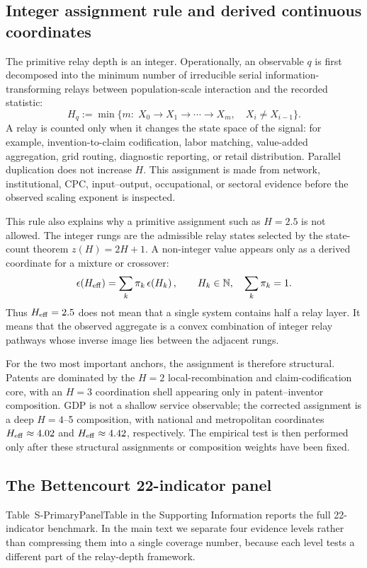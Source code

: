 \subsection{Integer assignment rule and derived continuous coordinates}
\label{subsec:integer_assignment_rule}

The primitive relay depth is an integer. Operationally, an observable \(q\)
is first decomposed into the minimum number of irreducible serial
information-transforming relays between population-scale interaction and the
recorded statistic:
\[
H_q := \min\{m:\; X_0\rightarrow X_1\rightarrow\cdots\rightarrow X_m,
\quad X_i\neq X_{i-1}\}.
\]
A relay is counted only when it changes the state space of the signal:
for example, invention-to-claim codification, labor matching, value-added
aggregation, grid routing, diagnostic reporting, or retail distribution.
Parallel duplication does not increase \(H\). This assignment is made from
network, institutional, CPC, input--output, occupational, or sectoral evidence
before the observed scaling exponent is inspected.

This rule also explains why a primitive assignment such as \(H=2.5\) is not
allowed. The integer rungs are the admissible relay states selected by the
state-count theorem \(z(H)=2H+1\). A non-integer value appears only as a
derived coordinate for a mixture or crossover:
\[
\epsilon\!\left(H_{\mathrm{eff}}\right)=\sum_k \pi_k\,\epsilon\!\left(H_k\right),
\qquad H_k\in\mathbb{N},\quad \sum_k\pi_k=1.
\]
Thus \(H_{\mathrm{eff}}=2.5\) does not mean that a single system contains half a relay
layer. It means that the observed aggregate is a convex combination of
integer relay pathways whose inverse image lies between the adjacent rungs.

For the two most important anchors, the assignment is therefore structural.
Patents are dominated by the \(H=2\) local-recombination and claim-codification
core, with an \(H=3\) coordination shell appearing only in patent--inventor
composition. GDP is not a shallow service observable; the corrected assignment
is a deep \(H=4\)--5 composition, with national and metropolitan coordinates
\(H_{\mathrm{eff}}\approx4.02\) and \(H_{\mathrm{eff}}\approx4.42\), respectively. The empirical
test is then performed only after these structural assignments or composition
weights have been fixed.

\subsection{The Bettencourt 22-indicator panel}\label{subsec:waterfall_layers}
Table~\textsf{S-PrimaryPanelTable} in the Supporting Information reports the
full 22-indicator benchmark. In the main text we separate four evidence levels
rather than compressing them into a single coverage number, because each level
tests a different part of the relay-depth framework.

